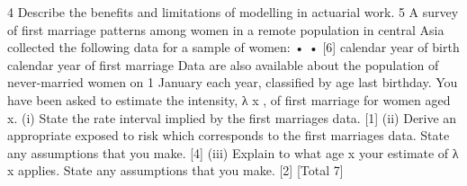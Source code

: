4 Describe the benefits and limitations of modelling in actuarial work.
5 A survey of first marriage patterns among women in a remote population in central
Asia collected the following data for a sample of women:
•
•
[6]
calendar year of birth
calendar year of first marriage
Data are also available about the population of never-married women on 1 January
each year, classified by age last birthday.
You have been asked to estimate the intensity, λ x , of first marriage for women
aged x.
(i) State the rate interval implied by the first marriages data. [1]
(ii) Derive an appropriate exposed to risk which corresponds to the first
marriages data. State any assumptions that you make. [4]
(iii)
Explain to what age x your estimate of λ x applies. State any assumptions
that you make.
[2]
[Total 7]
